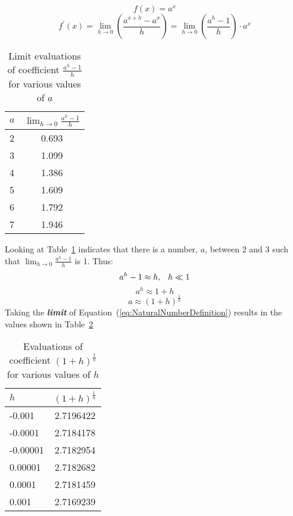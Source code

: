 \begin{equation}
f(x) = a^x
\end{equation}
\begin{equation}
f^\prime(x) = \lim_{h \rightarrow 0} \left(\frac{a^{x+h} - a^x}{h}\right) = \lim_{h \rightarrow 0}\left(\frac{a^h - 1}{h}\right)\cdot a^x
\end{equation}
%
\begin{table}[b]
\begin{center}
\caption{Limit evaluations of coefficient $\frac{a^h - 1}{h}$ for various values of $a$}
\label{tab:GenFormExponentialLims}
\begin{tabular}{l|c}
\hline
$a$ & $\lim_{h \rightarrow 0}\frac{a^h - 1}{h}$\\
\hline
2 & 0.693\\
3 & 1.099\\
4 & 1.386\\
5 & 1.609\\
6 & 1.792\\
7 & 1.946\\
\hline
\end{tabular}
\end{center}
\end{table}
%
Looking at Table~\ref{tab:GenFormExponentialLims} indicates that there is a number, $a$, between 2 and 3 such that $\lim_{h \rightarrow 0}\frac{a^h - 1}{h}$ is 1. Thus:
%
\begin{equation}
a^h - 1 \approx h, \hphantom{-} h \ll 1
\end{equation}
%
\begin{equation}
a^h \approx 1+h
\end{equation}
%
\begin{equation}
\label{eq:NaturalNumberDefinition}
a \approx \left(1+h\right)^{\frac{1}{h}}
\end{equation}
%
Taking the \textbf{\textit{limit}} of Equation~(\ref{eq:NaturalNumberDefinition}) results in the values shown in Table~\ref{tab:NaturalNumberDefinition}
%
\begin{table}[b]
\begin{center}
\caption{Evaluations of coefficient $\left(1+h\right)^{\frac{1}{h}}$ for various values of $h$}
\label{tab:NaturalNumberDefinition}
\begin{tabular}{l|c}
\hline
$h$ & $\left(1+h\right)^{\frac{1}{h}}$\\
\hline
-0.001 & 2.7196422\\
-0.0001 & 2.7184178\\
-0.00001 & 2.7182954\\
0.00001 & 2.7182682\\
0.0001 & 2.7181459\\
0.001 & 2.7169239\\
\hline
\end{tabular}
\end{center}
\end{table}
